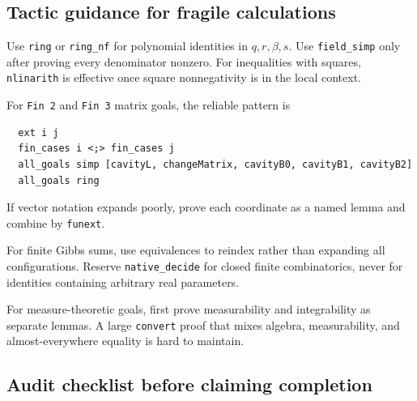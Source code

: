 \documentclass[11pt]{article}
\numberwithin{equation}{section}
\newcommand{\1}{\mathbf 1}
\begin{document}
\subsection{Tactic guidance for fragile calculations}

Use \texttt{ring} or \texttt{ring\_nf} for polynomial identities in
$q,r,\beta,s$.  Use \texttt{field\_simp} only after proving every denominator
nonzero.  For inequalities with squares, \texttt{nlinarith} is effective
once square nonnegativity is in the local context.

For \texttt{Fin 2} and \texttt{Fin 3} matrix goals, the reliable pattern is
\begin{lstlisting}
  ext i j
  fin_cases i <;> fin_cases j
  all_goals simp [cavityL, changeMatrix, cavityB0, cavityB1, cavityB2]
  all_goals ring
\end{lstlisting}
If vector notation expands poorly, prove each coordinate as a named lemma
and combine by \texttt{funext}.

For finite Gibbs sums, use equivalences to reindex rather than expanding all
configurations.  Reserve \texttt{native\_decide} for closed finite
combinatorics, never for identities containing arbitrary real parameters.

For measure-theoretic goals, first prove measurability and integrability as
separate lemmas.  A large \texttt{convert} proof that mixes algebra,
measurability, and almost-everywhere equality is hard to maintain.

\subsection{Audit checklist before claiming completion}
\end{document}
